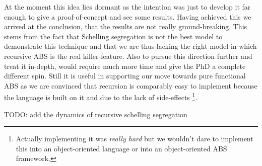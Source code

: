 At the moment this idea lies dormant as the intention was just to develop it far enough to give a proof-of-concept and see some results. Having achieved this we arrived at the conclusion, that the results are not really ground-breaking. This stems from the fact that Schelling segregation is not the best model to demonstrate this technique and that we are thus lacking the right model in which recursive ABS is the real killer-feature. Also to pursue this direction further and treat it in-depth, would require much more time and give the PhD a complete different spin. Still it is useful in supporting our move towards pure functional ABS as we are convinced that recursion is comparably easy to implement because the language is built on it and due to the lack of side-effects \footnote{Actually implementing it was \textit{really hard} but we wouldn't dare to implement this into an object-oriented language or into an object-oriented ABS framework.}.

TODO: add the dynamics of recursive schelling segregation